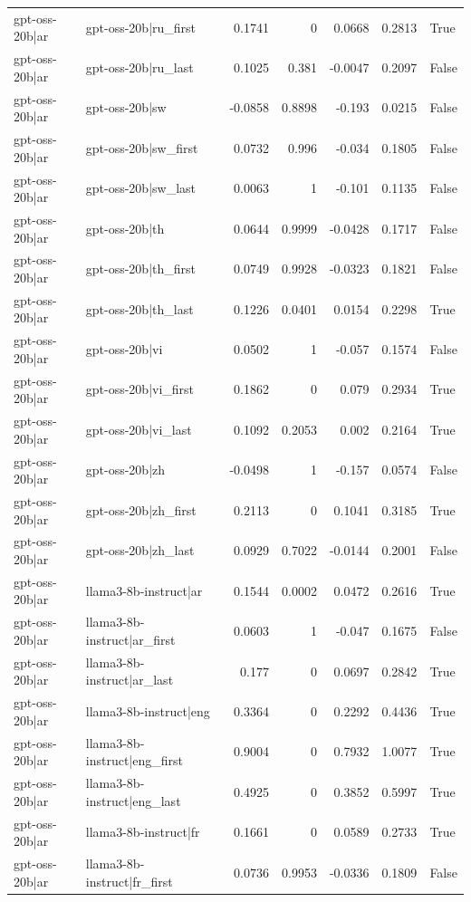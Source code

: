 \begin{table}
\begin{tabular}{l l r r r r l}
gpt-oss-20b|ar & gpt-oss-20b|ru_first & 0.1741 & 0 & 0.0668 & 0.2813 & True \\
gpt-oss-20b|ar & gpt-oss-20b|ru_last & 0.1025 & 0.381 & -0.0047 & 0.2097 & False \\
gpt-oss-20b|ar & gpt-oss-20b|sw & -0.0858 & 0.8898 & -0.193 & 0.0215 & False \\
gpt-oss-20b|ar & gpt-oss-20b|sw_first & 0.0732 & 0.996 & -0.034 & 0.1805 & False \\
gpt-oss-20b|ar & gpt-oss-20b|sw_last & 0.0063 & 1 & -0.101 & 0.1135 & False \\
gpt-oss-20b|ar & gpt-oss-20b|th & 0.0644 & 0.9999 & -0.0428 & 0.1717 & False \\
gpt-oss-20b|ar & gpt-oss-20b|th_first & 0.0749 & 0.9928 & -0.0323 & 0.1821 & False \\
gpt-oss-20b|ar & gpt-oss-20b|th_last & 0.1226 & 0.0401 & 0.0154 & 0.2298 & True \\
gpt-oss-20b|ar & gpt-oss-20b|vi & 0.0502 & 1 & -0.057 & 0.1574 & False \\
gpt-oss-20b|ar & gpt-oss-20b|vi_first & 0.1862 & 0 & 0.079 & 0.2934 & True \\
gpt-oss-20b|ar & gpt-oss-20b|vi_last & 0.1092 & 0.2053 & 0.002 & 0.2164 & True \\
gpt-oss-20b|ar & gpt-oss-20b|zh & -0.0498 & 1 & -0.157 & 0.0574 & False \\
gpt-oss-20b|ar & gpt-oss-20b|zh_first & 0.2113 & 0 & 0.1041 & 0.3185 & True \\
gpt-oss-20b|ar & gpt-oss-20b|zh_last & 0.0929 & 0.7022 & -0.0144 & 0.2001 & False \\
gpt-oss-20b|ar & llama3-8b-instruct|ar & 0.1544 & 0.0002 & 0.0472 & 0.2616 & True \\
gpt-oss-20b|ar & llama3-8b-instruct|ar_first & 0.0603 & 1 & -0.047 & 0.1675 & False \\
gpt-oss-20b|ar & llama3-8b-instruct|ar_last & 0.177 & 0 & 0.0697 & 0.2842 & True \\
gpt-oss-20b|ar & llama3-8b-instruct|eng & 0.3364 & 0 & 0.2292 & 0.4436 & True \\
gpt-oss-20b|ar & llama3-8b-instruct|eng_first & 0.9004 & 0 & 0.7932 & 1.0077 & True \\
gpt-oss-20b|ar & llama3-8b-instruct|eng_last & 0.4925 & 0 & 0.3852 & 0.5997 & True \\
gpt-oss-20b|ar & llama3-8b-instruct|fr & 0.1661 & 0 & 0.0589 & 0.2733 & True \\
gpt-oss-20b|ar & llama3-8b-instruct|fr_first & 0.0736 & 0.9953 & -0.0336 & 0.1809 & False \\

\end{tabular}
\end{table}
